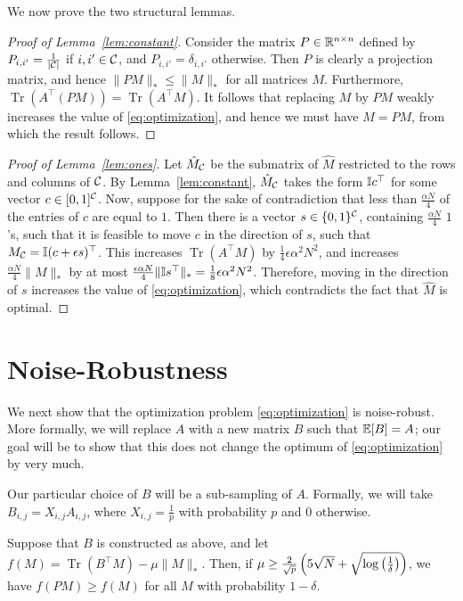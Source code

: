 \documentclass[11pt]{article}
\DeclareMathOperator{\Tr}{Tr}
\newcommand{\M}{\hat{M}}
\begin{document}
We now prove the two structural lemmas.
\begin{proof}[Proof of Lemma~\ref{lem:constant}]
Consider the matrix $P \in \mathbb{R}^{n \times n}$ defined by 
$P_{i,i'} = \frac{1}{|\mathcal{C}|}$ if $i,i' \in \mathcal{C}$, and 
$P_{i,i'} = \delta_{i,i'}$ otherwise. Then $P$ is clearly a 
projection matrix, and hence $\|PM\|_* \leq \|M\|_*$ for all 
matrices $M$. Furthermore, $\Tr(A^{\top}(PM)) = \Tr(A^{\top}M)$. 
It follows that replacing $M$ by $PM$ weakly increases the value of 
\eqref{eq:optimization}, and hence we must have $M = PM$, from which 
the result follows.
\end{proof}

\begin{proof}[Proof of Lemma~\ref{lem:ones}]
Let $\M_{\sC}$ be the submatrix of $\M$ restricted 
to the rows and columns of $\mathcal{C}$. By Lemma~\ref{lem:constant}, 
$\M_{\sC}$ takes the form $\mathbb{I} c^{\top}$ for some vector 
$c \in [0,1]^{\mathcal{C}}$. Now, suppose for the sake of contradiction 
that less than $\frac{\alpha N}{4}$ of the entries of $c$ 
are equal to $1$. Then there is a vector 
$s \in \{0,1\}^{\mathcal{C}}$, containing $\frac{\alpha N}{4}$ 
$1$'s, such that it is feasible to move $c$ in the direction of 
$s$, such that $M_{\mathcal{C}} = \mathbb{I} (c+\epsilon s)^{\top}$. This 
increases $\Tr(A^{\top}M)$ by $\frac{1}{4}\epsilon \alpha^2 N^2$, 
and increases $\frac{\alpha N}{4}\|M\|_*$ by at most 
$\frac{\epsilon \alpha N}{4}\|\mathbb{I} s^{\top}\|_* = \frac{1}{8}\epsilon \alpha^2 N^2$. 
Therefore, moving in the direction of $s$ increases the value of 
\eqref{eq:optimization}, which contradicts the fact that $\M$ is optimal.
\end{proof}

\section{Noise-Robustness}

We next show that the optimization problem \eqref{eq:optimization} is 
noise-robust. More formally, we will replace $A$ with a new matrix $B$ 
such that $\mathbb{E}[B] = A$; our goal will be to show that this does 
not change the optimum of \eqref{eq:optimization} by very much.

Our particular choice of $B$ will be a sub-sampling of $A$. Formally, 
we will take $B_{i,j} = X_{i,j}A_{i,j}$, where $X_{i,j} = \frac{1}{p}$ 
with probability $p$ and $0$ otherwise.

\begin{proposition}
Suppose that $B$ is constructed as above, and let $f(M) = \Tr(B^{\top}M) - \mu \|M\|_*$. 
Then, if $\mu \geq \frac{2}{\sqrt{p}}\left(5\sqrt{N} + \sqrt{\log\left(\frac{1}{\delta}\right)}\right)$, we 
have $f(PM) \geq f(M)$ for all $M$ with probability $1-\delta$.
\end{proposition}
\end{document}
